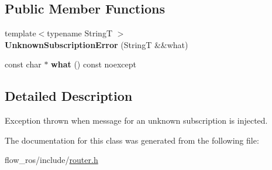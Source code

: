 \subsection*{Public Member Functions}
\begin{DoxyCompactItemize}
\item 
\mbox{\label{classflow__ros_1_1_unknown_subscription_error_a7583ea02082517c342cf9634d8d39806}} 
{\footnotesize template$<$typename StringT $>$ }\\{\bfseries Unknown\+Subscription\+Error} (StringT \&\&what)
\item 
\mbox{\label{classflow__ros_1_1_unknown_subscription_error_a148fedb06eae3261c5634042c4359a7d}} 
const char $\ast$ {\bfseries what} () const noexcept
\end{DoxyCompactItemize}


\subsection{Detailed Description}
Exception thrown when message for an unknown subscription is injected. 

The documentation for this class was generated from the following file\+:\begin{DoxyCompactItemize}
\item 
flow\+\_\+ros/include/\hyperlink{router_8h}{router.\+h}\end{DoxyCompactItemize}
